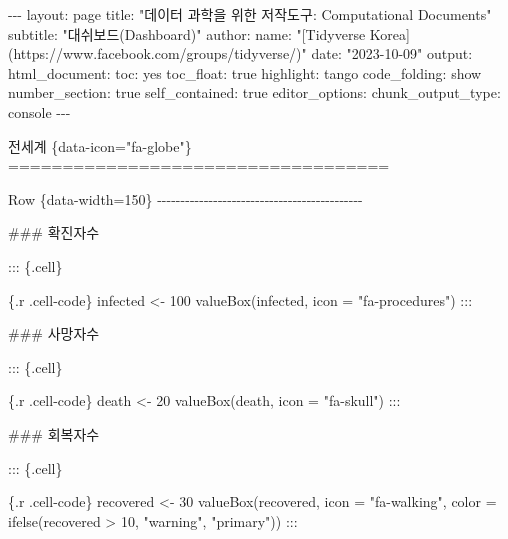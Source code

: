 \documentclass[
  letterpaper,
]{book}
\newenvironment{Shaded}{\begin{snugshade}}{\end{snugshade}}
\newcommand{\CommentTok}[1]{\textcolor[rgb]{0.37,0.37,0.37}{#1}}
\newcommand{\FunctionTok}[1]{\textcolor[rgb]{0.28,0.35,0.67}{#1}}
\newcommand{\InformationTok}[1]{\textcolor[rgb]{0.37,0.37,0.37}{#1}}
\newcommand{\NormalTok}[1]{\textcolor[rgb]{0.00,0.23,0.31}{#1}}
\newcommand{\OtherTok}[1]{\textcolor[rgb]{0.00,0.23,0.31}{#1}}
\begin{document}
\begin{Shaded}
\begin{Highlighting}[]

\NormalTok{{-}{-}{-}}
\NormalTok{layout: page}
\NormalTok{title: "데이터 과학을 위한 저작도구: Computational Documents"}
\NormalTok{subtitle: "대쉬보드(Dashboard)"}
\NormalTok{author:}
\NormalTok{    name: "}\CommentTok{[}\OtherTok{Tidyverse Korea}\CommentTok{](https://www.facebook.com/groups/tidyverse/)}\NormalTok{"}
\NormalTok{date: "2023{-}10{-}09"}
\NormalTok{output:}
\NormalTok{  html\_document: }
\NormalTok{    toc: yes}
\NormalTok{    toc\_float: true}
\NormalTok{    highlight: tango}
\NormalTok{    code\_folding: show}
\NormalTok{    number\_section: true}
\NormalTok{    self\_contained: true}
\NormalTok{editor\_options: }
\NormalTok{  chunk\_output\_type: console}
\NormalTok{{-}{-}{-}}

\NormalTok{전세계 \{data{-}icon="fa{-}globe"\}}
\FunctionTok{===================================}

\NormalTok{Row \{data{-}width=150\} }
\NormalTok{{-}{-}{-}{-}{-}{-}{-}{-}{-}{-}{-}{-}{-}{-}{-}{-}{-}{-}{-}{-}{-}{-}{-}{-}{-}{-}{-}{-}{-}{-}{-}{-}{-}{-}{-}{-}{-}{-}{-}{-}{-}{-}{-}{-}}

\FunctionTok{\#\#\# 확진자수}

\NormalTok{::: \{.cell\}}

\InformationTok{\textasciigrave{}\textasciigrave{}\textasciigrave{}\{.r .cell{-}code\}}
\InformationTok{infected \textless{}{-} 100}
\InformationTok{valueBox(infected, icon = "fa{-}procedures")}
\InformationTok{\textasciigrave{}\textasciigrave{}\textasciigrave{}}
\NormalTok{:::}

\FunctionTok{\#\#\# 사망자수}

\NormalTok{::: \{.cell\}}

\InformationTok{\textasciigrave{}\textasciigrave{}\textasciigrave{}\{.r .cell{-}code\}}
\InformationTok{death \textless{}{-} 20}
\InformationTok{valueBox(death, icon = "fa{-}skull")}
\InformationTok{\textasciigrave{}\textasciigrave{}\textasciigrave{}}
\NormalTok{:::}

\FunctionTok{\#\#\# 회복자수}

\NormalTok{::: \{.cell\}}

\InformationTok{\textasciigrave{}\textasciigrave{}\textasciigrave{}\{.r .cell{-}code\}}
\InformationTok{recovered \textless{}{-} 30}
\InformationTok{valueBox(recovered, }
\InformationTok{         icon = "fa{-}walking",}
\InformationTok{         color = ifelse(recovered \textgreater{} 10, "warning", "primary"))}
\InformationTok{\textasciigrave{}\textasciigrave{}\textasciigrave{}}
\NormalTok{:::}



\end{Highlighting}
\end{Shaded}
\end{document}
